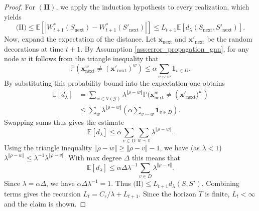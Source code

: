 \documentclass[10pt,a4paper]{amsart}
\begin{document}
\begin{proof}
For $\mathbf{(II)}$, we apply the induction hypothesis to every realization, which yields
\[
\text{(II)} \le \mathbb{E} \left[ |W_{t+1}^*(S_{\mathrm{next}}) - W_{t+1}^*(S'_{\mathrm{next}})| \right] \le L_{t+1} \mathbb{E} \left[ d_{\lambda}(S_{\mathrm{\mathrm{next}}}, S'_{\mathrm{next}}) \right].
\]
Now, expand the expectation of the distance. Let $\mathbf{x}_{\mathrm{next}}$ and $\mathbf{x}'_{\mathrm{next}}$ be the random decorations at time $t+1$. By Assumption \ref{ass:error_propagation_gnn}, for any node $w$ it follows from the triangle inequality that
\[
\mathbb{P}\left(\mathbf{x}_{\mathrm{next}}^w \neq (\mathbf{x}'_{\mathrm{next}})^w \right) \le \alpha \sum_{v \sim w} \mathbf{1}_{v \in D}.
\]
By substituting this probability bound into the expectation one obtains
\begin{align*}
    \mathbb{E}[d_{\lambda}] &= \sum_{w \in V(\mathcal G)} \lambda^{\Vert \rho - w \Vert} \mathbb{P}(\mathbf{x}_{\mathrm{next}}^w \neq \left(\mathbf{x}'_{\mathrm{next}})^w \right) \\
    &\le \sum_{w} \lambda^{\Vert \rho - w \Vert} \left( \alpha \sum_{v \sim w} \mathbf{1}_{v \in D} \right).
\end{align*}
Swapping sums thus gives the estimate
\[
\mathbb{E}[d_{\lambda}]\le \alpha \sum_{v \in D} \sum_{w \sim v} \lambda^{\Vert \rho - w \Vert}.
\]
Using the triangle inequality $\Vert \rho - w \Vert \ge \Vert \rho - v \Vert - 1$, we have (as $\lambda <1$) $\lambda^{\Vert \rho - w \Vert} \le \lambda^{-1} \lambda^{\Vert \rho - v \Vert}$. With max degree $\Delta$ this means that
\[
\mathbb{E}[d_{\lambda}]\le \alpha \Delta \lambda^{-1} \sum_{v \in D} \lambda^{\Vert \rho - v \Vert}.
\]
Since $\lambda = \alpha \Delta$, we have $\alpha \Delta \lambda^{-1} = 1$. Thus $\text{(II)} \le L_{t+1} d_{\lambda}(S, S')$.
Combining terms gives the recursion $L_t = C_r/\lambda + L_{t+1}$. Since the horizon $T$ is finite, $L_t < \infty$ and the claim is shown.
\end{proof}
\end{document}
